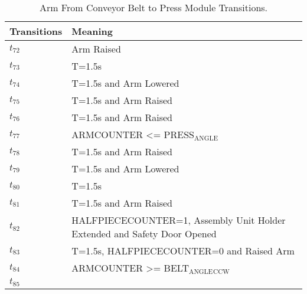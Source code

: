 \begin{table}[H]
\caption{Arm From Conveyor Belt to Press Module Transitions.}
\centering
\begin{tabular}{M{5cm}M{10cm}}
Transitions & Meaning\\
\hline
\hyperlink{partialNet:t721}{\hypertarget{partialTable:t72}{$t_{72}$}} & Arm Raised\\
\hyperlink{partialNet:tt731}{\hypertarget{partialTable:tt73}{$t_{73}$}} & T=1.5s\\
\hyperlink{partialNet:tt741}{\hypertarget{partialTable:tt74}{$t_{74}$}} & T=1.5s and Arm Lowered\\
\hyperlink{partialNet:tt751}{\hypertarget{partialTable:tt75}{$t_{75}$}} & T=1.5s and Arm Raised\\
\hyperlink{partialNet:tt761}{\hypertarget{partialTable:tt76}{$t_{76}$}} & T=1.5s and Arm Raised\\
\hyperlink{partialNet:t771}{\hypertarget{partialTable:t77}{$t_{77}$}} & ARMCOUNTER <= PRESS\(_{\text{ANGLE}}\)\\
\hyperlink{partialNet:tt781}{\hypertarget{partialTable:tt78}{$t_{78}$}} & T=1.5s and Arm Raised\\
\hyperlink{partialNet:tt791}{\hypertarget{partialTable:tt79}{$t_{79}$}} & T=1.5s and Arm Lowered\\
\hyperlink{partialNet:tt801}{\hypertarget{partialTable:tt80}{$t_{80}$}} & T=1.5s\\
\hyperlink{partialNet:tt811}{\hypertarget{partialTable:tt81}{$t_{81}$}} & T=1.5s and Arm Raised\\
\hyperlink{partialNet:t821}{\hypertarget{partialTable:t82}{$t_{82}$}} & HALFPIECECOUNTER=1, Assembly Unit Holder Extended and Safety Door Opened\\
\hyperlink{partialNet:tt831}{\hypertarget{partialTable:tt83}{$t_{83}$}} & T=1.5s, HALFPIECECOUNTER=0 and Raised Arm\\
\hyperlink{partialNet:t841}{\hypertarget{partialTable:t84}{$t_{84}$}} & ARMCOUNTER >= BELT\(_{\text{ANGLE}}\)\(_{\text{CCW}}\)\\
\hyperlink{partialNet:t851}{\hypertarget{partialTable:t85}{$t_{85}$}} & \\
\end{tabular}
\end{table}
